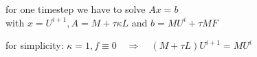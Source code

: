 for one timestep we have to solve \qquad $ Ax = b $ \\ [1cm]
with $x = U^{i+1}, A = M + \tau \kappa L$ and $ b = M U^i + \tau M F$

for simplicity: $\kappa = 1, f \equiv 0 \quad \Rightarrow \quad (M + \tau L)U^{i+1} = M U^i$





